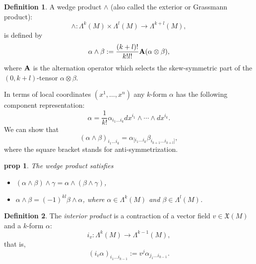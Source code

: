\documentclass[a4paper]{article}
\theoremstyle{definition}
\newtheorem{defn}{Definition}
\theoremstyle{plain}
\newtheorem{prop}{prop}
\begin{document}
    \begin{defn}
        A wedge product $\wedge$ (also called the exterior
        or Grassmann product):
         \begin{equation}
            \wedge
            : \Lambda^{k}(M) \times \Lambda^{l}(M)
            \to \Lambda^{k+l}(M),
        \end{equation}
        is defined by
        \begin{equation}
            \alpha \wedge \beta
            := \frac{(k+l)!}{k!l!} \bf A (\alpha \otimes
            \beta),
        \end{equation}
        where $\bf A$ is the alternation operator which
        selects the skew-symmetric part of the
        $(0,k+l)$-tensor $\alpha \otimes \beta$.
    \end{defn}
    In terms of local coordinates $(x^{1},\ldots,x^{n})$ any
    $k$-form $\alpha$ has the following component
    representation:
    \begin{equation}
        \alpha
        = \frac{1}{k!} \alpha_{i_1\ldots i_k}
        dx^{i_1} \wedge \cdots \wedge dx^{i_k}.
    \end{equation}
    We can show that
    \begin{equation}
        (\alpha \wedge \beta)_{i_1\ldots i_k}
        = \alpha_{[i_1\ldots i_k} \beta_{i_{k+1}\ldots
        i_{k+l}]},
    \end{equation}
    where the square bracket stands for anti-symmetrization.

    \begin{prop}
        The wedge product satisfies
        \begin{itemize}
            \item $(\alpha \wedge \beta) \wedge \gamma =
                \alpha \wedge (\beta \wedge \gamma)$,
            \item $\alpha \wedge \beta = (-1)^{kl} \beta
                \wedge \alpha$, where $\alpha \in
                \Lambda^{k}(M)$ and $\beta \in
                \Lambda^{l}(M)$.
        \end{itemize}
    \end{prop}

    \begin{defn}
        The \textit{interior product} is a contraction of a
        vector field $v \in \mathfrak{X}(M)$ and a $k$-form
        $\alpha$:
        \begin{equation}
            i_v
            : \Lambda^{k}(M)
            \to \Lambda^{k-1}(M),
        \end{equation}
        that is,
        \begin{equation}
            (i_v \alpha)_{i_1\ldots i_{k-1}}
            := v^{j} \alpha_{j_1\ldots i_{k-1}}.
        \end{equation}
    \end{defn}
\end{document}
